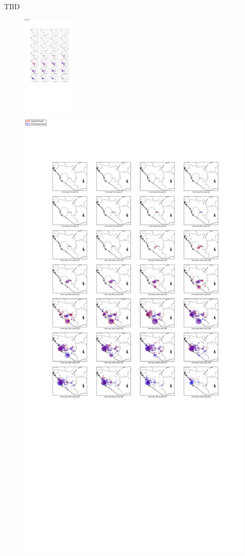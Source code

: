 \documentclass[12pt]{article}
\begin{document}
TBD

\begin{figure}%
\begin{center}
  \includegraphics[width=1in]{graph/elabel.pdf}

  \includegraphics[width=5.9 in]{graph/ee.pdf}

\end{center}
\end{figure}
\end{document}
